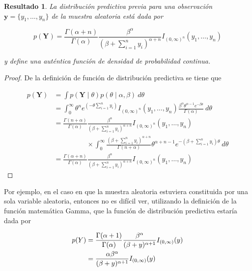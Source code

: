 \documentclass[
  10pt,
  spanish,
]{book}
\newtheorem{proposition}{Resultado}[chapter]
\theoremstyle{definition}
\theoremstyle{definition}
\theoremstyle{definition}
\theoremstyle{definition}
\theoremstyle{remark}
\begin{document}
\begin{proposition}
\protect\hypertarget{prp:unnamed-chunk-55}{}{\label{prp:unnamed-chunk-55} }La distribución predictiva previa para una observación \(\mathbf{y}=\{y_1,\ldots,y_n\}\) de la muestra aleatoria está dada por

\begin{equation}
p(\mathbf{Y})=\frac{\Gamma(\alpha+n)}{\Gamma(\alpha)}\frac{\beta^\alpha}{(\beta+\sum_{i=1}^ny_i)^{\alpha+n}}
I_{(0,\infty)^n}(y_1,\ldots,y_n)
\end{equation}

y define una auténtica función de densidad de probabilidad continua.
\end{proposition}

\begin{proof}
{}De la definición de función de distribución predictiva se tiene que

\begin{align*}
p(\mathbf{Y})&=\int p(\mathbf{Y} \mid \theta)p(\theta \mid \alpha,\beta)\ d\theta\\
&=\int_0^{\infty}\theta^n e^{(-\theta \sum_{i=1}^ny_i)}I_{(0,\infty)^n}(y_1,\ldots,y_n)\frac{\beta^\alpha \theta^{\alpha-1} e^{-\beta\theta}}{\Gamma(\alpha)} \ d\theta\\
&=\frac{\Gamma(n+\alpha)}{\Gamma(\alpha)}\frac{\beta^\alpha}{(\beta+\sum_{i=1}^ny_i)^{\alpha+n}}I_{(0,\infty)^n}(y_1,\ldots,y_n)\\
&\hspace{2cm}\times
\int_0^{\infty} \frac{(\beta+\sum_{i=1}^ny_i)^{\alpha+n}}{\Gamma(n+\alpha)} \theta^{\alpha+n-1}e^{-(\beta+\sum_{i=1}^ny_i)\theta}
\ d\theta\\
&=\frac{\Gamma(\alpha+n)}{\Gamma(\alpha)}\frac{\beta^\alpha}{(\beta+\sum_{i=1}^ny_i)^{\alpha+n}}I_{(0,\infty)^n}(y_1,\ldots,y_n)
\end{align*}
\end{proof}

Por ejemplo, en el caso en que la muestra aleatoria estuviera constituida por una sola variable aleatoria, entonces no es difícil ver, utilizando la definición de la función matemática Gamma, que la función de distribución predictiva estaría dada por

\begin{align*}
p(Y)&=\frac{\Gamma(\alpha+1)}{\Gamma(\alpha)}\frac{\beta^\alpha}{(\beta+y)^{\alpha+1}}
I_{(0,\infty)}(y)\notag \\
&=\frac{\alpha \beta^\alpha}{(\beta+y)^{\alpha+1}}
I_{(0,\infty)}(y)
\end{align*}
\end{document}
